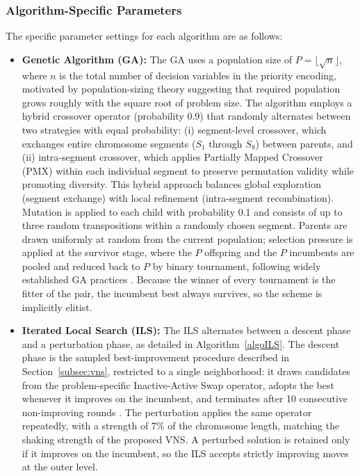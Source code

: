 \documentclass[preprint,12pt,authoryear]{elsarticle}
\begin{document}
\subsubsection{Algorithm-Specific Parameters}
\label{subsubsec:params}

The specific parameter settings for each algorithm are as follows:

\begin{itemize}
    \item \textbf{Genetic Algorithm (GA):} The GA uses a population size of $P = \lfloor\sqrt{n}\rfloor$, where $n$ is the total number of decision variables in the priority encoding,
    motivated by population-sizing theory suggesting that required population grows roughly with the square root of problem size. The algorithm employs a hybrid crossover operator (probability 0.9)
    that randomly alternates between two strategies with equal probability: (i) segment-level crossover, which exchanges entire chromosome segments ($S_1$ through $S_8$) between parents, and
    (ii) intra-segment crossover, which applies Partially Mapped Crossover (PMX) within each individual segment to preserve permutation validity while promoting diversity. This hybrid approach
    balances global exploration (segment exchange) with local refinement (intra-segment recombination). Mutation is applied to each child with probability 0.1 and consists of up to three
    random transpositions within a randomly chosen segment. Parents are drawn uniformly at random from the current population; selection pressure is applied at the survivor stage, where
    the $P$ offspring and the $P$ incumbents are pooled and reduced back to $P$ by binary tournament, following widely established GA practices \citep{hussain2022genetic}. Because the
    winner of every tournament is the fitter of the pair, the incumbent best always survives, so the scheme is implicitly elitist.

    \item \textbf{Iterated Local Search (ILS):} The ILS alternates between a descent phase and a perturbation phase, as detailed in Algorithm~\ref{algoILS}. The descent phase is the
    sampled best-improvement procedure described in Section~\ref{subsec:vns}, restricted to a single neighborhood: it draws candidates from the problem-specific Inactive-Active Swap
    operator, adopts the best whenever it improves on the incumbent, and terminates after 10 consecutive non-improving rounds \citep{tinos2024iterated}. The perturbation applies the same
    operator repeatedly, with a strength of 7\% of the chromosome length, matching the shaking strength of the proposed VNS. A perturbed solution is retained only if it improves on the
    incumbent, so the ILS accepts strictly improving moves at the outer level.


\end{itemize}
\end{document}
